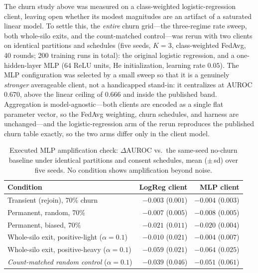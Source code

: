 \documentclass[12pt]{report}
\begin{document}
The churn study above was measured on a class-weighted logistic-regression
client, leaving open whether its modest magnitudes are an artifact of a
saturated linear model. To settle this, the \emph{entire} churn grid---the
three-regime rate sweep, both whole-silo exits, and the count-matched
control---was rerun with two clients on identical partitions and schedules
(five seeds, $K{=}3$, class-weighted FedAvg, 40 rounds; 200 training runs in
total): the original logistic regression, and a one-hidden-layer MLP (64 ReLU
units, He initialization, learning rate $0.05$). The MLP configuration was
selected by a small sweep so that it is a genuinely \emph{stronger} averageable
client, not a handicapped stand-in: it centralizes at AUROC $0.670$, above the
linear ceiling of $0.666$ and inside the published band. Aggregation is
model-agnostic---both clients are encoded as a single flat parameter vector, so
the FedAvg weighting, churn schedules, and harness are unchanged---and the
logistic-regression arm of the rerun reproduces the published churn table
exactly, so the two arms differ only in the client model.

\begin{table}[htbp]
\centering
\caption{Executed MLP amplification check: $\Delta$AUROC vs.\ the same-seed
no-churn baseline under identical partitions and consent schedules, mean
($\pm$\,sd) over five seeds. No condition shows amplification beyond noise.}
\label{tab:mlp_check}
\begin{tabular}{lrr}
\toprule
Condition & LogReg client & MLP client \\
\midrule
Transient (rejoin), 70\% churn                    & $-0.003$ ($0.001$) & $-0.004$ ($0.003$) \\
Permanent, random, 70\%                           & $-0.007$ ($0.005$) & $-0.008$ ($0.005$) \\
Permanent, biased, 70\%                           & $-0.021$ ($0.011$) & $-0.020$ ($0.004$) \\
Whole-silo exit, positive-light ($\alpha{=}0.1$)  & $-0.010$ ($0.021$) & $-0.004$ ($0.007$) \\
Whole-silo exit, positive-heavy ($\alpha{=}0.1$)  & $-0.059$ ($0.021$) & $-0.064$ ($0.025$) \\
\emph{Count-matched random control} ($\alpha{=}0.1$) & $-0.039$ ($0.046$) & $-0.051$ ($0.061$) \\
\bottomrule
\end{tabular}
\end{table}
\end{document}
